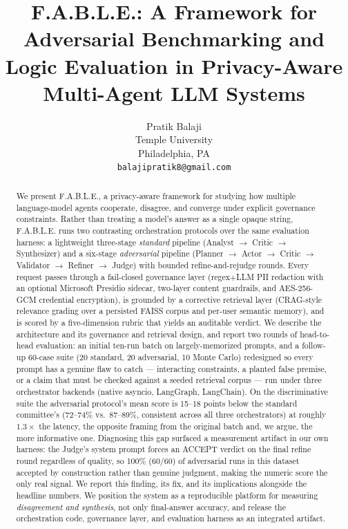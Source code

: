 \documentclass{article}
\title{F.A.B.L.E.: A Framework for Adversarial Benchmarking and \\ Logic Evaluation in Privacy-Aware Multi-Agent LLM Systems}
\author{%
  Pratik Balaji \\
  Temple University \\
  Philadelphia, PA \\
  \texttt{balajipratik8@gmail.com} \\
}
\date{}
\begin{document}
\maketitle

\begin{abstract}
We present F.A.B.L.E., a privacy-aware framework for studying how multiple language-model
agents cooperate, disagree, and converge under explicit governance constraints. Rather than
treating a model's answer as a single opaque string, F.A.B.L.E. runs two contrasting
orchestration protocols over the same evaluation harness: a lightweight three-stage
\emph{standard} pipeline (Analyst $\rightarrow$ Critic $\rightarrow$ Synthesizer) and a
six-stage \emph{adversarial} pipeline (Planner $\rightarrow$ Actor $\rightarrow$ Critic
$\rightarrow$ Validator $\rightarrow$ Refiner $\rightarrow$ Judge) with bounded
refine-and-rejudge rounds. Every request passes through a fail-closed governance layer
(regex$+$LLM PII redaction with an optional Microsoft Presidio sidecar, two-layer content
guardrails, and AES-256-GCM credential encryption), is grounded by a corrective
retrieval layer (CRAG-style relevance grading over a persisted FAISS corpus and per-user
semantic memory), and is scored by a five-dimension rubric that yields an auditable verdict.
We describe the architecture and its governance and retrieval design, and report two rounds of
head-to-head evaluation: an initial ten-run batch on largely-memorized prompts, and a
follow-up 60-case suite (20 standard, 20 adversarial, 10 Monte Carlo) redesigned so every
prompt has a genuine flaw to catch --- interacting constraints, a planted false premise, or a
claim that must be checked against a seeded retrieval corpus --- run under three orchestrator
backends (native asyncio, LangGraph, LangChain). On the discriminative suite the adversarial
protocol's mean score is 15--18 points below the standard committee's (72--74\% vs.\ 87--89\%,
consistent across all three orchestrators) at roughly $1.3\times$ the latency, the opposite
framing from the original batch and, we argue, the more informative one. Diagnosing this gap
surfaced a measurement artifact in our own harness: the Judge's system prompt forces an ACCEPT
verdict on the final refine round regardless of quality, so 100\% (60/60) of adversarial runs
in this dataset accepted by construction rather than genuine judgment, making the numeric score
the only real signal. We report this finding, its fix, and its implications alongside the
headline numbers. We position the system as a reproducible platform for measuring
\emph{disagreement and synthesis}, not only final-answer accuracy, and release the
orchestration code, governance layer, and evaluation harness as an integrated artifact.
\end{abstract}
\end{document}
